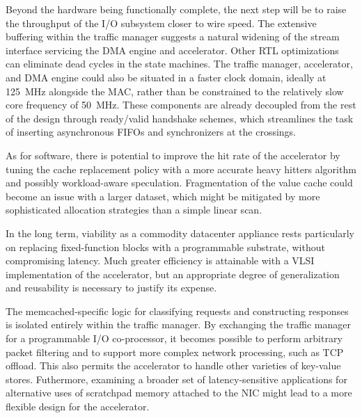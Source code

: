 
Beyond the hardware being functionally complete, the next step will be
to raise the throughput of the I/O subsystem closer to wire speed.
The extensive buffering within the traffic manager suggests a natural
widening of the stream interface servicing the DMA engine and
accelerator.
Other RTL optimizations can eliminate dead cycles in the state machines.
The traffic manager, accelerator, and DMA engine could also be situated
in a faster clock domain, ideally at \SI{125}{\mega\hertz} alongside the
MAC, rather than be constrained to the relatively slow core
frequency of \SI{50}{\mega\hertz}.
These components are already decoupled from the rest of the design
through ready/valid handshake schemes, which streamlines the task of
inserting asynchronous FIFOs and synchronizers at the crossings.

As for software, there is potential to improve the hit rate of the
accelerator by tuning the cache replacement policy with a more accurate
heavy hitters algorithm and possibly workload-aware speculation.
Fragmentation of the value cache could become an issue with a larger
dataset, which might be mitigated by more sophisticated allocation
strategies than a simple linear scan.

In the long term, viability as a commodity datacenter appliance rests
particularly on replacing fixed-function blocks with a programmable
substrate, without compromising latency.
Much greater efficiency is attainable with a VLSI implementation of the
accelerator, but an appropriate degree of generalization and reusability
is necessary to justify its expense.

The memcached-specific logic for classifying requests and constructing
responses is isolated entirely within the traffic manager.
By exchanging the traffic manager for a programmable I/O co-processor,
it becomes possible to perform arbitrary packet filtering and to
support more complex network processing, such as TCP offload.
This also permits the accelerator to handle other varieties of key-value
stores.
Futhermore, examining a broader set of latency-sensitive applications
for alternative uses of scratchpad memory attached to the NIC might lead
to a more flexible design for the accelerator.
